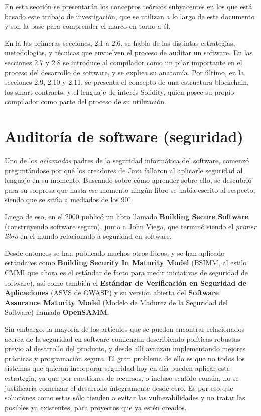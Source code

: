 En esta sección se presentarán los conceptos teóricos subyacentes en los que está basado este trabajo de investigación, que se utilizan a lo largo de este documento y son la base para comprender el marco en torno a él.

En la las primeras secciones, 2.1 a 2.6, se habla de las distintas estrategias, metodologías, y técnicas que envuelven el proceso de auditar un software. En las secciones 2.7 y 2.8 se introduce al compilador como un pilar importante en el proceso del desarrollo de software, y se explica su anatomía. Por último, en la secciones 2.9, 2.10 y 2.11, se presenta el concepto de una estructura blockchain, los smart contracts, y el lenguaje de interés Solidity, quién posee su propio compilador como parte del proceso de su utilización.


\section{Auditoría de software (seguridad)}
Uno de los \textit{aclamados} padres de la seguridad informática del software, comenzó preguntándose por qué los creadores de Java fallaron al aplicarle seguridad al lenguaje en su momento. Buscando sobre cómo aprender sobre ello, se descubrió para su sorpresa que hasta ese momento ningún libro se había escrito al respecto, siendo que se sitúa a mediados de los 90'.

Luego de eso, en el 2000 publicó un libro llamado \textbf{Building Secure Software} (construyendo software seguro), junto a John Viega, que terminó siendo el \textit{primer libro} en el mundo relacionado a seguridad en software.

Desde entonces se han publicado muchos otros libros\cite{McGraw:2006:SSB:1121680}\cite{Shostack:2014:TMD:2829295}\cite{Hoglund:2004:ESB:984253}\cite{Howard:2009:DSS:1594832}\cite{Klein:2011:BHD:2823924}\cite{Allen:2008:SSE:1386212}\cite{Wysopal:2006:ASS:1196390}\cite{Ransome:2013:CSS:2613389}, y se han aplicado estándares como \textbf{Building Security In Maturity Model}\cite{McGraw:2015:SSB:2675327.2675329} (BSIMM, al estilo CMMI que ahora es el estándar de facto para medir iniciativas de seguridad de software), así como también el \textbf{Estándar de Verificación en Seguridad de Aplicaciones}\cite{OWASP:AVSP} (ASVS de OWASP) y su versión abierta del \textbf{Software Assurance Maturity Model} (Modelo de Madurez de la Seguridad del Software) llamado \textbf{OpenSAMM}\cite{OWASP:OpenSAMM}.

Sin embargo, la mayoría de los artículos que se pueden encontrar relacionados acerca de la seguridad en software comienzan describiendo políticas robustas previo al desarrollo del producto, y desde allí avanzan implementando mejores prácticas y programación segura. El gran problema de ello es que no todos los sistemas que quieran incorporar seguridad hoy en día pueden aplicar esta estrategia, ya que por cuestiones de recursos, o incluso sentido común, no se justificaría comenzar el desarrollo íntegramente desde cero. Es por eso que soluciones como estas sólo tienden a evitar las vulnerabilidades y no tratar las posibles ya existentes, para proyectos que ya estén creados.

